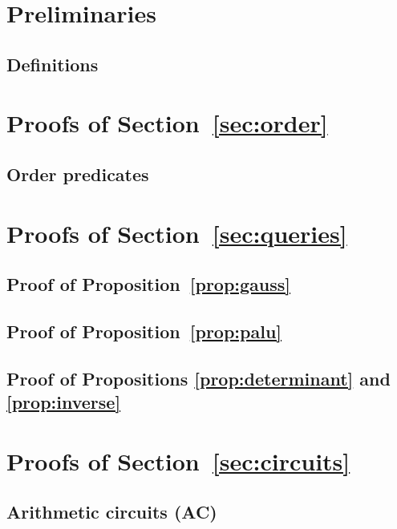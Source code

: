 
\section{Preliminaries}

\subsection{Definitions}



\section{Proofs of Section~\ref{sec:order}}

\subsection{Order predicates}\label{app:order}



\section{Proofs of Section~\ref{sec:queries}}

\subsection{Proof of Proposition~\ref{prop:gauss}}


\subsection{Proof of Proposition~\ref{prop:palu}}


\subsection{Proof of Propositions \ref{prop:determinant} and \ref{prop:inverse}}



\section{Proofs of Section~\ref{sec:circuits}}

\subsection{Arithmetic circuits (AC)}


